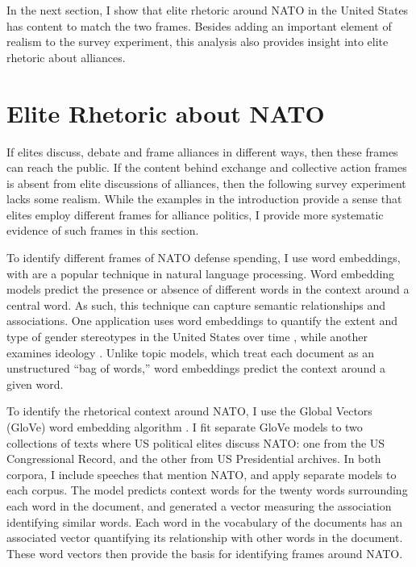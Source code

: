 \documentclass[12pt]{article}
\begin{document}
In the next section, I show that elite rhetoric around NATO in the United States has content to match the two frames. 
Besides adding an important element of realism to the survey experiment, this analysis also provides insight into elite rhetoric about alliances. 


\section{Elite Rhetoric about NATO}


If elites discuss, debate and frame alliances in different ways, then these frames can reach the public. 
If the content behind exchange and collective action frames is absent from elite discussions of alliances, then the following survey experiment lacks some realism. 
While the examples in the introduction provide a sense that elites employ different frames for alliance politics, I provide more systematic evidence of such frames in this section. 


To identify different frames of NATO defense spending, I use word embeddings, with are a popular technique in natural language processing. 
Word embedding models predict the presence or absence of different words in the context around a central word. 
As such, this technique can capture semantic relationships and associations.
One application uses word embeddings to quantify the extent and type of gender stereotypes in the United States over time \citep{Gargetal2018}, while another examines ideology \citep{RheaultCochrane2020}.
Unlike topic models, which treat each document as an unstructured ``bag of words,'' word embeddings predict the context around a given word.  


To identify the rhetorical context around NATO, I use the Global Vectors (GloVe) word embedding algorithm \citep{Penningtonetal2014}.  
I fit separate GloVe models to two collections of texts where US political elites discuss NATO: one from the US Congressional Record, and the other from US Presidential archives. 
In both corpora, I include speeches that mention NATO, and apply separate models to each corpus. 
The model predicts context words for the twenty words surrounding each word in the document, and generated a vector measuring the association identifying similar words. 
Each word in the vocabulary of the documents has an associated vector quantifying its relationship with other words in the document. 
These word vectors then provide the basis for identifying frames around NATO. 
\end{document}
